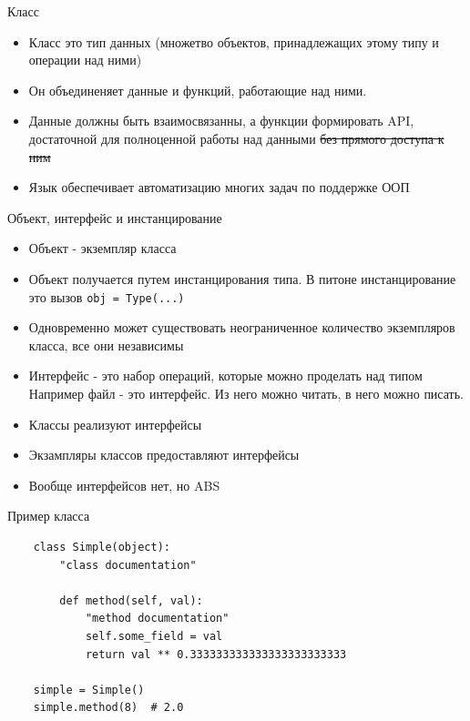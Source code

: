 \documentclass{article}
\begin{document}
\LARGE

\begin{center} Класс\end{center}
\begin{itemize}
    \item Класс это тип данных (множетво объектов, 
                принадлежащих этому типу и операции над ними)
    \item Он объединеняет данные и функций, работающие над ними.
    \item Данные должны быть взаимосвязанны, а функции формировать API, 
            достаточной для полноценной работы над данными   \sout{без прямого 
            доступа к ним}
    \item Язык обеспечивает автоматизацию многих задач по поддержке ООП
\end{itemize}
\newpage

\begin{center} Объект, интерфейс и инстанцирование \end{center}
\begin{itemize}
    \item Объект - экземпляр класса
    \item Объект получается путем инстанцирования типа. 
          В питоне инстанцирование это вызов
               \lstinline!obj = Type(...)!
    \item Одновременно может существовать неограниченное количество 
          экземпляров класса, все они независимы
    \item Интерфейс - это набор операций, которые можно проделать над типом
          Например файл - это интерфейс. Из него можно читать, в него можно писать.
    \item Классы реализуют интерфейсы
    \item Экзампляры классов предоставляют интерфейсы
    \item Вообще интерфейсов нет, но ABS
\end{itemize}
\newpage

\begin{center} Пример класса \end{center}
\vspace{15pt}
\begin{lstlisting}
    class Simple(object):
        "class documentation"

        def method(self, val):
            "method documentation"
            self.some_field = val
            return val ** 0.333333333333333333333333

    simple = Simple()
    simple.method(8)  # 2.0
\end{lstlisting}
\newpage
\end{document}
